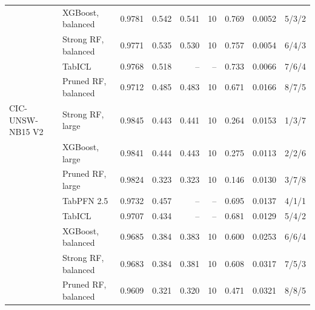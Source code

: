 \begin{tabular}{@{}llrrrrrrr@{}}
 & XGBoost, balanced & 0.9781 & 0.542 & 0.541 & 10 & 0.769 & 0.0052 & 5/3/2 \\
 & Strong RF, balanced & 0.9771 & 0.535 & 0.530 & 10 & 0.757 & 0.0054 & 6/4/3 \\
 & TabICL & 0.9768 & 0.518 & -- & -- & 0.733 & 0.0066 & 7/6/4 \\
 & Pruned RF, balanced & 0.9712 & 0.485 & 0.483 & 10 & 0.671 & 0.0166 & 8/7/5 \\
\addlinespace
CIC-UNSW-NB15 V2 & Strong RF, large & 0.9845 & 0.443 & 0.441 & 10 & 0.264 & 0.0153 & 1/3/7 \\
 & XGBoost, large & 0.9841 & 0.444 & 0.443 & 10 & 0.275 & 0.0113 & 2/2/6 \\
 & Pruned RF, large & 0.9824 & 0.323 & 0.323 & 10 & 0.146 & 0.0130 & 3/7/8 \\
 & TabPFN 2.5 & 0.9732 & 0.457 & -- & -- & 0.695 & 0.0137 & 4/1/1 \\
 & TabICL & 0.9707 & 0.434 & -- & -- & 0.681 & 0.0129 & 5/4/2 \\
 & XGBoost, balanced & 0.9685 & 0.384 & 0.383 & 10 & 0.600 & 0.0253 & 6/6/4 \\
 & Strong RF, balanced & 0.9683 & 0.384 & 0.381 & 10 & 0.608 & 0.0317 & 7/5/3 \\
 & Pruned RF, balanced & 0.9609 & 0.321 & 0.320 & 10 & 0.471 & 0.0321 & 8/8/5 \\
\bottomrule
\end{tabular}
